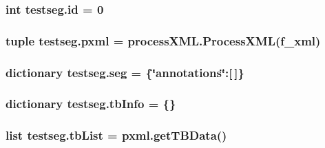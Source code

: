 \subsubsection[{id}]{\setlength{\rightskip}{0pt plus 5cm}int testseg.\+id = 0}\label{namespacetestseg_a9ea63c9f06cbe30d98fb141abbe3408f}
\hypertarget{namespacetestseg_aca6b8e7f85de00b3288d6fe9dfac1b0d}{}
\subsubsection[{pxml}]{\setlength{\rightskip}{0pt plus 5cm}tuple testseg.\+pxml = {\bf process\+X\+M\+L.\+Process\+X\+M\+L}({\bf f\+\_\+xml})}\label{namespacetestseg_aca6b8e7f85de00b3288d6fe9dfac1b0d}
\hypertarget{namespacetestseg_a78990116d33c0c0ce6560fb619b73ca8}{}
\subsubsection[{seg}]{\setlength{\rightskip}{0pt plus 5cm}dictionary testseg.\+seg = \{\char`\"{}annotations\char`\"{}\+:\mbox{[}$\,$\mbox{]}\}}\label{namespacetestseg_a78990116d33c0c0ce6560fb619b73ca8}
\hypertarget{namespacetestseg_ad5490470ebfd1e3f374e02c5dc028ffe}{}
\subsubsection[{tb\+Info}]{\setlength{\rightskip}{0pt plus 5cm}dictionary testseg.\+tb\+Info = \{\}}\label{namespacetestseg_ad5490470ebfd1e3f374e02c5dc028ffe}
\hypertarget{namespacetestseg_ac9a1deec5e3475b9370d75794bc65316}{}
\subsubsection[{tb\+List}]{\setlength{\rightskip}{0pt plus 5cm}list testseg.\+tb\+List = pxml.\+get\+T\+B\+Data()}\label{namespacetestseg_ac9a1deec5e3475b9370d75794bc65316}
